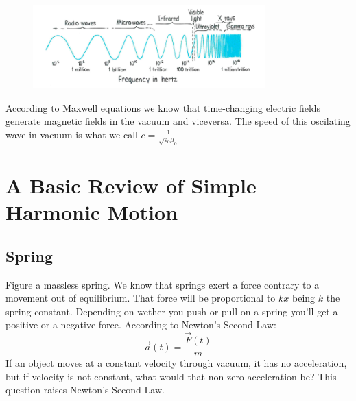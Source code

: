 \documentclass{report}
\begin{document}
  \begin{figure}[h]
    \centering
    \includegraphics[width=0.8\textwidth]{visible_spectrum.png}
  \end{figure}

  \noindent According to Maxwell equations we know that time-changing electric fields generate magnetic fields in the vacuum and viceversa. The speed of this oscilating wave in vacuum is what we call $c=\frac{1}{\sqrt{\varepsilon_0\mu_0}}$
  \clearpage

  \section{A Basic Review of Simple Harmonic Motion}
    \subsection{Spring}
      \noindent Figure a massless spring. We know that springs exert a force contrary to a movement out of equilibrium. That force will be proportional to $kx$ being $k$ the spring constant. Depending on wether you push or pull on a spring you'll get a positive or a negative force. According to Newton's Second Law:
      \begin{equation}
        \vec{a}(t)=\dfrac{\vec{F}(t)}{m}
      \end{equation}
      \noindent If an object moves at a constant velocity through vacuum, it has no acceleration, but if velocity is not constant, what would that non-zero acceleration be? This question raises Newton's Second Law.\\
\end{document}
